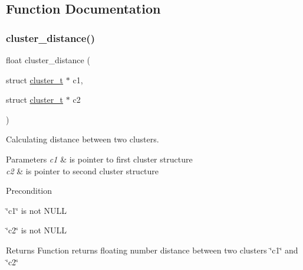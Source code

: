 \subsection{Function Documentation}
\mbox{\label{group___cluster_calculations_gaf336f28a62c28da792f6def84f432bb2}} 
\subsubsection{\texorpdfstring{cluster\+\_\+distance()}{cluster\_distance()}}
{\footnotesize\ttfamily float cluster\+\_\+distance (\begin{DoxyParamCaption}\item[{struct \mbox{\hyperlink{structcluster__t}{cluster\+\_\+t}} $\ast$}]{c1,  }\item[{struct \mbox{\hyperlink{structcluster__t}{cluster\+\_\+t}} $\ast$}]{c2 }\end{DoxyParamCaption})}



Calculating distance between two clusters. 


\begin{DoxyParams}{Parameters}
{\em c1} & is pointer to first cluster structure\\
\hline
{\em c2} & is pointer to second cluster structure\\
\hline
\end{DoxyParams}
\begin{DoxyPrecond}{Precondition}

\begin{DoxyItemize}
\item \char`\"{}c1\char`\"{} is not N\+U\+LL
\item \char`\"{}c2\char`\"{} is not N\+U\+LL
\end{DoxyItemize}
\end{DoxyPrecond}
\begin{DoxyReturn}{Returns}
Function returns floating number distance between two clusters \char`\"{}c1\char`\"{} and \char`\"{}c2\char`\"{} 
\end{DoxyReturn}
\mbox{\label{group___cluster_calculations_ga5f16d682e7c859f7bd3f27697c2b7cc0}} 
